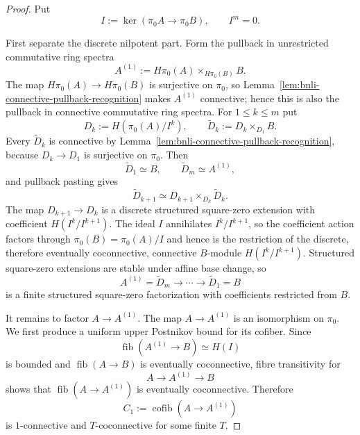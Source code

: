 \begin{proof}
Put
\[
    I:=\ker(\pi_0A\to\pi_0B),
    \qquad I^m=0.
\]

First separate the discrete nilpotent part.  Form the pullback in unrestricted
commutative ring spectra
\[
    A^{(1)}
    :=
    H\pi_0(A)\times_{H\pi_0(B)}B.
\]
The map $H\pi_0(A)\to H\pi_0(B)$ is surjective on $\pi_0$, so
Lemma~\ref{lem:bnli-connective-pullback-recognition} makes $A^{(1)}$
connective; hence this is also the pullback in connective commutative ring
spectra.  For $1\leq k\leq m$ put
\[
    D_k:=H(\pi_0(A)/I^k),
    \qquad
    \widetilde D_k:=D_k\times_{D_1}B.
\]
Every $\widetilde D_k$ is connective by
Lemma~\ref{lem:bnli-connective-pullback-recognition}, because
$D_k\to D_1$ is surjective on $\pi_0$.  Then
\[
    \widetilde D_1\simeq B,
    \qquad
    \widetilde D_m\simeq A^{(1)},
\]
and pullback pasting gives
\[
    \widetilde D_{k+1}
    \simeq
    D_{k+1}\times_{D_k}\widetilde D_k.
\]
The map $D_{k+1}\to D_k$ is a discrete structured square-zero extension with
coefficient $H(I^k/I^{k+1})$.  The ideal $I$ annihilates
$I^k/I^{k+1}$, so the coefficient action factors through
$\pi_0(B)=\pi_0(A)/I$ and hence is the restriction of the discrete, therefore
eventually coconnective, connective $B$-module $H(I^k/I^{k+1})$.
Structured square-zero extensions are stable under affine base change, so
\[
    A^{(1)}=\widetilde D_m\longrightarrow\cdots
    \longrightarrow\widetilde D_1=B
\]
is a finite structured square-zero factorization with coefficients restricted
from $B$.

It remains to factor $A\to A^{(1)}$.  The map $A\to A^{(1)}$ is an
isomorphism on $\pi_0$.  We first produce a uniform upper Postnikov bound for
its cofiber.  Since
\[
    \operatorname{fib}(A^{(1)}\to B)
    \simeq H(I)
\]
is bounded and $\operatorname{fib}(A\to B)$ is eventually coconnective, fibre
transitivity for
\[
    A\longrightarrow A^{(1)}\longrightarrow B
\]
shows that $\operatorname{fib}(A\to A^{(1)})$ is eventually coconnective.
Therefore
\[
    C_1:=\operatorname{cofib}(A\to A^{(1)})
\]
is $1$-connective and $T$-coconnective for some finite $T$.


\end{proof}
